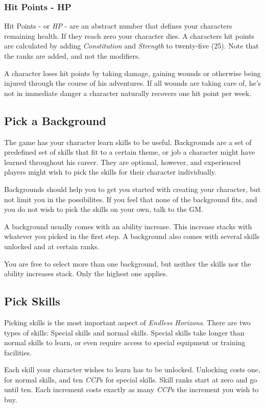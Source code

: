 \subsubsection{Hit Points - HP}

Hit Points - or \emph{HP} - are an abstract number that defines your characters
remaining health. If they reach zero your character dies. A characters hit
points are calculated by adding \emph{Constitution} and \emph{Strength} to
twenty-five (25). Note that the ranks are added, and not the modifiers.

A character loses hit points by taking damage, gaining wounds or otherwise being
injured through the course of his adventures. If all wounds are taking care of,
he's not in immediate danger a character naturally recovers one hit point per
week.

\subsection{Pick a Background}

The game has your character learn skills to be useful. Backgrounds are a set of
predefined set of skills that fit to a certain theme, or job a character might
have learned throughout his career. They are optional, however, and experienced
players might wish to pick the skills for their character individually.

Backgrounds should help you to get you started with creating your character, but
not limit you in the possibilites. If you feel that none of the background fits,
and you do not wish to pick the skills on your own, talk to the GM.

A background usually comes with an ability increase. This increase stacks with
whatever you picked in the first step. A background also comes with several
skills unlocked and at certain ranks.

You are free to select more than one background, but neither the skills nor the
ability increases stack. Only the highest one applies.

\subsection{Pick Skills}

Picking skills is the most important aspect of \emph{Endless Horizons}. There
are two types of skills: Special skills and normal skills. Special skills take
longer than normal skills to learn, or even require access to special equipment
or training facilities.

Each skill your character wishes to learn has to be unlocked. Unlocking costs
one, for normal skills, and ten \emph{CCP}s for special skills. Skill ranks
start at zero and go until ten. Each increment costs exactly as many
\emph{CCP}s the increment you wish to buy.
